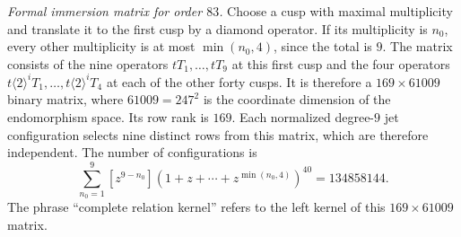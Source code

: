 \noindent\emph{Formal immersion matrix for order $83$.}
Choose a cusp with maximal multiplicity and translate it to the first
cusp by a diamond operator. If its multiplicity is $n_0$, every
other multiplicity is at most $\min(n_0,4)$, since the total is $9$.
The matrix consists of the nine operators $tT_1,\ldots,tT_9$ at
this first cusp and the four operators
$t\langle2\rangle^iT_1,\ldots,t\langle2\rangle^iT_4$ at each
of the other forty cusps. It is therefore a
$169\times61009$ binary matrix, where $61009=247^2$ is the
coordinate dimension of the endomorphism space.
Its row rank is $169$. Each normalized degree-$9$ jet configuration
selects nine distinct rows from this matrix, which are therefore
independent. The number of configurations is
\[
 \sum_{n_0=1}^{9}[z^{9-n_0}]
   (1+z+\cdots+z^{\min(n_0,4)})^{40}=134858144.
\]
The phrase ``complete relation kernel'' refers to the left kernel
of this $169\times61009$ matrix.
